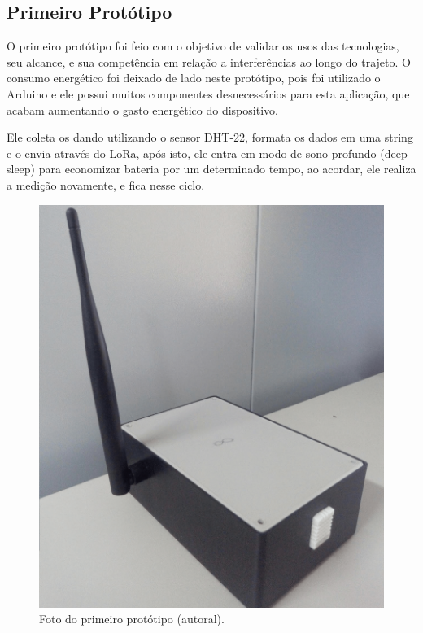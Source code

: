 \subsection{Primeiro Protótipo}
\label{metod:end-node:1-proto}
O primeiro protótipo foi feio com o objetivo de validar os usos das tecnologias, seu alcance, e sua competência em relação a interferências ao longo do trajeto. O consumo energético foi deixado de lado neste protótipo, pois foi utilizado o Arduino e ele possui muitos componentes desnecessários para esta aplicação, que acabam aumentando o gasto energético do dispositivo.

Ele coleta os dando utilizando o sensor DHT-22, formata os dados em uma string e o envia através do LoRa, após isto, ele entra em modo de sono profundo (deep sleep) para economizar bateria por um determinado tempo, ao acordar, ele realiza a medição novamente, e fica nesse ciclo.

\begin{figure}[H]
  \centering
  \includegraphics[width=.80\textwidth]{assets/end-node-proto-1.png} 
  \caption{Foto do primeiro protótipo (autoral).}
  \label{fig:end-node-proto-1} 
\end{figure}

